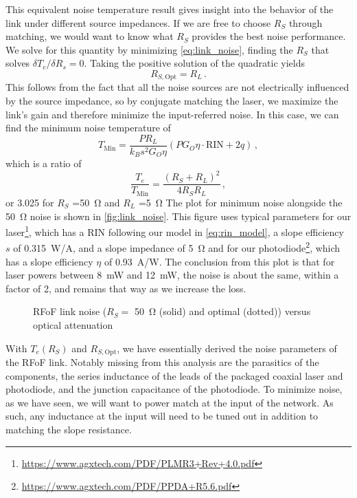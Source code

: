 This equivalent noise temperature result gives insight into the behavior of the link under different source impedances.
If we are free to choose $R_S$ through matching, we would want to know what $R_S$ provides the best noise performance.
We solve for this quantity by minimizing \autoref{eq:link_noise}, finding the $R_S$ that solves $\delta T_e/\delta R_s=0$.
Taking the positive solution of the quadratic yields
\begin{equation}
    R_{S,\text{Opt}} = R_L \,.
\end{equation}
This follows from the fact that all the noise sources are not electrically influenced by the source impedance, so by conjugate matching the laser, we maximize the link's gain and therefore minimize the input-referred noise.
In this case, we can find the minimum noise temperature of
\begin{equation}
    T_\text{Min}  = \frac{PR_L}{k_Bs^2G_O\eta}\left(PG_O\eta\cdot\text{RIN} + 2q\right) \,,
    \label{eq:min_link_noise}
\end{equation}
which is a ratio of
\begin{equation}
    \frac{T_e}{T_\text{Min}} = \frac{(R_S+R_L)^2}{4R_SR_L} \,,
\end{equation}
or \num{3.025} for $R_S$ \qty{=50}{\ohm} and $R_L$ \qty{=5}{\ohm}
The plot for minimum noise alongside the \qty{50}{\ohm} noise is shown in \autoref{fig:link_noise}.
This figure uses typical parameters for our laser\footnote{\url{https://www.agxtech.com/PDF/PLMR3+Rev+4.0.pdf}}, which has a RIN following our model in \autoref{eq:rin_model}, a slope efficiency $s$ of \qty{0.315}{\watt/\ampere}, and a slope impedance of \qty{5}{\ohm} and for our photodiode\footnote{\url{https://www.agxtech.com/PDF/PPDA+R5.6.pdf}}, which has a slope efficiency $\eta$ of \qty{0.93}{\ampere/\watt}.
The conclusion from this plot is that for laser powers between \qty{8}{\mW} and \qty{12}{\mW}, the noise is about the same, within a factor of 2, and remains that way as we increase the loss.

\begin{figure}[ht!]
    \centering
    
    \caption[RFoF link noise]{RFoF link noise ($R_S=$ \qty{50}{\ohm} (solid) and optimal (dotted)) versus optical attenuation}
    \label{fig:link_noise}
\end{figure}

With $T_e(R_S)$ and $R_{S,\text{Opt}}$, we have essentially derived the noise parameters of the RFoF link.
Notably missing from this analysis are the parasitics of the components, the series inductance of the leads of the packaged coaxial laser and photodiode, and the junction capacitance of the photodiode.
To minimize noise, as we have seen, we will want to power match at the input of the network.
As such, any inductance at the input will need to be tuned out in addition to matching the slope resistance.

